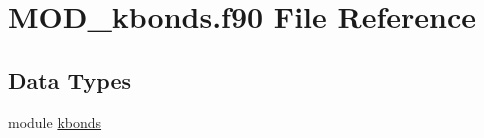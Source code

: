 \hypertarget{MOD__kbonds_8f90}{\section{M\-O\-D\-\_\-kbonds.\-f90 File Reference}
\label{MOD__kbonds_8f90}
}
\subsection*{Data Types}
\begin{DoxyCompactItemize}
\item 
module \hyperlink{classkbonds}{kbonds}
\end{DoxyCompactItemize}
